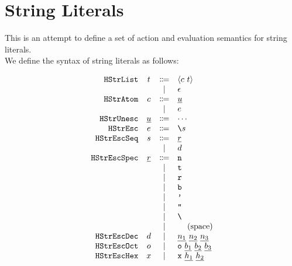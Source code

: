 \documentclass[12pt]{article}
\begin{document}
\section{String Literals}
This is an attempt to define a set of action and evaluation semantics for string literals. \\

\noindent We define the syntax of string literals as follows:
%
\begin{center}
  \vspace*{-1.5em}
  \[\begin{array}{rccl}
    \texttt{HStrList}    & t    & \Coloneqq & \langle c~t \rangle \\
                &                 & \mid         & \epsilon                            \\
    \texttt{HStrAtom}    & c    & \Coloneqq & \underline{u}                         \\
                &                 & \mid         & e                           \\
    \texttt{HStrUnesc}   & \underline{u}   & \Coloneqq & \cdots                                     \\
    \texttt{HStrEsc}     & e     & \Coloneqq & \texttt{\textbackslash}s              \\
    \texttt{HStrEscSeq}  & s  & \Coloneqq & \underline{r}                       \\
                &                 & \mid         & d                        \\
    \texttt{HStrEscSpec} & \underline{r} & \Coloneqq & \texttt{n}                                     \\
                &                 & \mid         & \texttt{t}                                     \\
                &                 & \mid         & \texttt{r}                                     \\
                &                 & \mid         & \texttt{b}                                     \\
                &                 & \mid         & \texttt{'}                                     \\
                &                 & \mid         & \texttt{"}                                     \\
                &                 & \mid         & \texttt{\textbackslash}                        \\
                &                 & \mid         & \texttt{ }~~\text{(space)}               \\ 
    \texttt{HStrEscDec}  & d  & \mid         & \underline{n_{1}}~\underline{n_{2}}~\underline{n_{3}}                          \\
    \texttt{HStrEscOct}  & o  & \mid         & \texttt{o}~\underline{b_{1}}~\underline{b_{2}}~\underline{b_{3}}                          \\
    \texttt{HStrEscHex}  & x  & \mid         & \texttt{x}~\underline{h_{1}}~\underline{h_{2}}                          \\
  \end{array}\]
\end{center}
\end{document}
